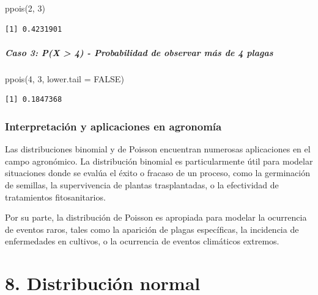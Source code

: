 \documentclass[
  spanish,
  letterpaper,
]{book}
\newenvironment{Shaded}{\begin{snugshade}}{\end{snugshade}}
\newcommand{\AttributeTok}[1]{\textcolor[rgb]{0.40,0.45,0.13}{#1}}
\newcommand{\ConstantTok}[1]{\textcolor[rgb]{0.56,0.35,0.01}{#1}}
\newcommand{\DecValTok}[1]{\textcolor[rgb]{0.68,0.00,0.00}{#1}}
\newcommand{\FunctionTok}[1]{\textcolor[rgb]{0.28,0.35,0.67}{#1}}
\newcommand{\NormalTok}[1]{\textcolor[rgb]{0.00,0.23,0.31}{#1}}
\begin{document}
\begin{Shaded}
\begin{Highlighting}[]
\FunctionTok{ppois}\NormalTok{(}\DecValTok{2}\NormalTok{, }\DecValTok{3}\NormalTok{)}
\end{Highlighting}
\end{Shaded}

\begin{verbatim}
[1] 0.4231901
\end{verbatim}

\subsubsection{Caso 3: P(X \textgreater{} 4) - Probabilidad de observar
más de 4
plagas}\label{caso-3-px-4---probabilidad-de-observar-muxe1s-de-4-plagas}

\begin{Shaded}
\begin{Highlighting}[]
\FunctionTok{ppois}\NormalTok{(}\DecValTok{4}\NormalTok{, }\DecValTok{3}\NormalTok{, }\AttributeTok{lower.tail =} \ConstantTok{FALSE}\NormalTok{)}
\end{Highlighting}
\end{Shaded}

\begin{verbatim}
[1] 0.1847368
\end{verbatim}

\section{Interpretación y aplicaciones en
agronomía}\label{interpretaciuxf3n-y-aplicaciones-en-agronomuxeda}

Las distribuciones binomial y de Poisson encuentran numerosas
aplicaciones en el campo agronómico. La distribución binomial es
particularmente útil para modelar situaciones donde se evalúa el éxito o
fracaso de un proceso, como la germinación de semillas, la supervivencia
de plantas trasplantadas, o la efectividad de tratamientos
fitosanitarios.

Por su parte, la distribución de Poisson es apropiada para modelar la
ocurrencia de eventos raros, tales como la aparición de plagas
específicas, la incidencia de enfermedades en cultivos, o la ocurrencia
de eventos climáticos extremos.

\part{8. Distribución normal}
\end{document}
